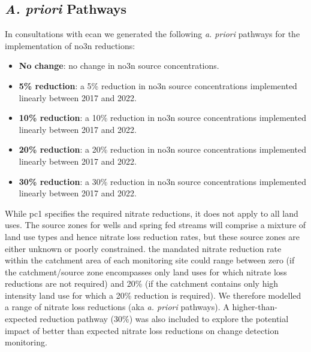 
\begin{landscape}
\end{landscape}


\subsection[Pathways]{\textit{A. priori} Pathways} \label{subsec:apriori}

In consultations with \gls{ecan} we generated the following \textit{a. priori} pathways for the implementation of \gls{no3n} reductions:
\begin{itemize}
    \item \textbf{No change}: no change in \gls{no3n} source concentrations.
    \item \textbf{5\% reduction}: a 5\% reduction in \gls{no3n} source concentrations implemented linearly between 2017 and 2022.
    \item \textbf{10\% reduction}: a 10\% reduction in \gls{no3n} source concentrations implemented linearly between 2017 and 2022.
    \item \textbf{20\% reduction}: a 20\% reduction in \gls{no3n} source concentrations implemented linearly between 2017 and 2022.
    \item \textbf{30\% reduction}: a 30\% reduction in \gls{no3n} source concentrations implemented linearly between 2017 and 2022.
\end{itemize}

While \gls{pc1} specifies the required nitrate reductions, it does not apply to all land uses.
The source zones for wells and spring fed streams will comprise a mixture of land use types and hence nitrate loss reduction rates, but these source zones are either unknown or poorly constrained.
the mandated nitrate reduction rate within the catchment area of each monitoring site could range between zero (if the catchment/source zone encompasses only land uses for which nitrate loss reductions are not required) and 20\% (if the catchment contains only high intensity land use for which a 20\% reduction is required).
We therefore modelled a range of nitrate loss reductions (aka \textit{a. priori} pathways).
A higher-than-expected reduction pathway (30\%) was also included to explore the potential impact of better than expected nitrate loss reductions on change detection monitoring.

